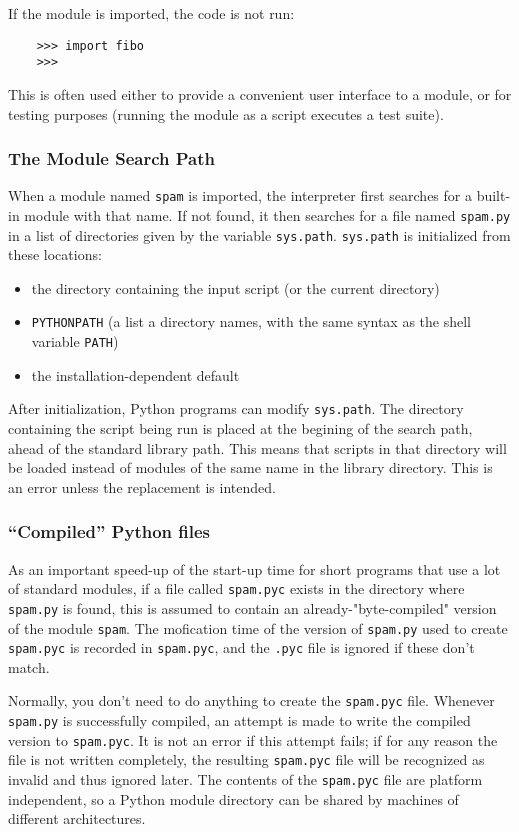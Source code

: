 \documentclass[UTF8]{article}
\begin{document}
If the module is imported, the code is not run:
\begin{verbatim}
    >>> import fibo
    >>>
\end{verbatim}
This is often used either to provide a convenient user interface to a module, or for testing
purposes (running the module as a script executes a test suite).

\subsubsection{The Module Search Path}
When a module named \texttt{spam} is imported, the interpreter first searches for a built-in module
with that name. If not found, it then searches for a file named \texttt{spam.py} in a list of
directories given by the variable \texttt{sys.path}. \texttt{sys.path} is initialized from these
locations:
\begin{itemize}
    \item the directory containing the input script (or the current directory)
    \item \texttt{PYTHONPATH} (a list a directory names, with the same syntax as the shell variable
    \texttt{PATH})
    \item the installation-dependent default
\end{itemize}

After initialization, Python programs can modify \texttt{sys.path}. The directory containing the
script being run is placed at the begining of the search path, ahead of the standard library path.
This means that scripts in that directory will be loaded instead of modules of the same name in the
library directory. This is an error unless the replacement is intended.

\subsubsection{``Compiled'' Python files}
As an important speed-up of the start-up time for short programs that use a lot of standard modules,
if a file called \texttt{spam.pyc} exists in the directory where \texttt{spam.py} is found, this is
assumed to contain an already-"byte-compiled" version of the module \texttt{spam}. The mofication
time of the version of \texttt{spam.py} used to create \texttt{spam.pyc} is recorded in
\texttt{spam.pyc}, and the \texttt{.pyc} file is ignored if these don't match.

Normally, you don't need to do anything to create the \texttt{spam.pyc} file. Whenever
\texttt{spam.py} is successfully compiled, an attempt is made to write the compiled version to
\texttt{spam.pyc}. It is not an error if this attempt fails; if for any reason the file is not
written completely, the resulting \texttt{spam.pyc} file will be recognized as invalid and thus
ignored later. The contents of the \texttt{spam.pyc} file are platform independent, so a Python
module directory can be shared by machines of different architectures.
\end{document}
